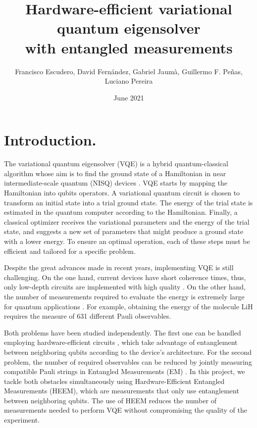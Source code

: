\documentclass[11pt, twocolumn]{article}
\title{Hardware-efficient variational quantum eigensolver \\with entangled measurements}
\date{June 2021}
\author{Francisco Escudero, David Fernández, Gabriel Jaumà, Guillermo F. Peñas, Luciano Pereira}
\begin{document}
\maketitle


\section{Introduction.}
The variational quantum eigensolver (VQE) \cite{peruzzo2014variational} is a hybrid quantum-classical algorithm whose aim is to find the ground state of a Hamiltonian in near intermediate-scale quantum (NISQ) devices \cite{NISQ}. VQE starts by mapping the Hamiltonian into qubits operators. A variational quantum circuit is chosen to transform an initial state into a trial ground state. The energy of the trial state is estimated in the quantum computer according to the Hamiltonian. Finally, a classical optimizer receives the variational parameters and the energy of the trial state, and suggests a new set of parameters that might produce a ground state with a lower energy. To ensure an optimal operation, each of these steps must be efficient and tailored for a specific problem. 

Despite the great advances made in recent years, implementing VQE is still challenging. On the one hand, current devices have short coherence times, thus, only low-depth circuits are implemented with high quality \cite{kandala2017hardware}. On the other hand, the number of measurements required to evaluate the energy is extremely large for quantum applications \cite{Wecker2015}. For example, obtaining the energy of the molecule LiH requires the measure of 631 different Pauli observables. 

Both problems have been studied independently. The first one can be handled employing hardware-efficient circuits \cite{kandala2017hardware}, which take advantage of entanglement between neighboring qubits according to the device’s architecture. For the second problem, the number of required observables can be reduced by jointly measuring compatible Pauli strings  in Entangled Measurements (EM) \cite{hamamura2020efficient}. In this project, we tackle both obstacles simultaneously using Hardware-Efficient Entangled Measurements (HEEM), which are measurements that only use entanglement between neighboring qubits. The use of HEEM reduces the number of measurements needed to perform VQE without compromising the quality of the experiment. 
\end{document}
